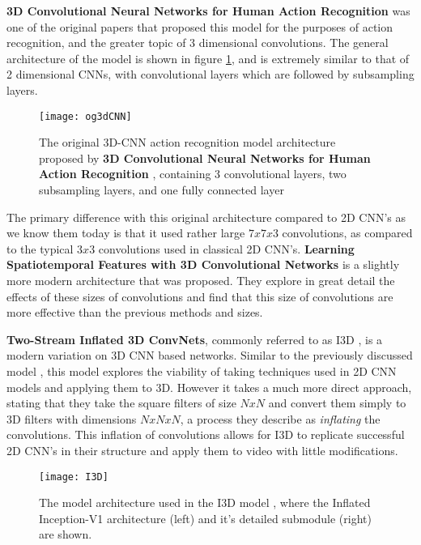 \textbf{3D Convolutional Neural Networks for Human Action Recognition} \cite{3DCNN-ActionRecognition} was one of the original papers that proposed this model for the purposes of action recognition, and the greater topic of 3 dimensional convolutions. The general architecture of the model is shown in figure \ref{fig:original3dcnn}, and is extremely similar to that of 2 dimensional CNNs, with convolutional layers which are followed by subsampling layers.

\begin{figure}[ht]
	\texttt{[image: og3dCNN]}
	\centering
	\caption{The original 3D-CNN action recognition model architecture proposed by \textbf{3D Convolutional Neural Networks for Human Action Recognition} \cite{3DCNN-ActionRecognition}, containing 3 convolutional layers, two subsampling layers, and one fully connected layer}
	\label{fig:original3dcnn}
\end{figure}

The primary difference with this original architecture compared to 2D CNN's as we know them today is that it used rather large $7x7x3$ convolutions, as compared to the typical $3x3$ convolutions used in classical 2D CNN's. \textbf{Learning Spatiotemporal Features with 3D Convolutional Networks} \cite{3x33dcnn} is a slightly more modern architecture that was proposed. They explore in great detail the effects of these sizes of convolutions and find that this size of convolutions are more effective than the previous methods and sizes.

\textbf{Two-Stream Inflated 3D ConvNets}, commonly referred to as I3D \cite{i3d}, is a modern variation on 3D CNN based networks. Similar to the previously discussed model \cite{3DCNN-ActionRecognition}, this model explores the viability of taking techniques used in 2D CNN models and applying them to 3D. However it takes a much more direct approach, stating that they take the square filters of size $NxN$ and convert them simply to 3D filters with dimensions $NxNxN$, a process they describe as \textit{inflating} the convolutions. This inflation of convolutions allows for I3D to replicate successful 2D CNN's in their structure and apply them to video with little modifications.

\begin{figure}[ht]
	\texttt{[image: I3D]}
	\centering
	\caption{The model architecture used in the I3D model \cite{i3d}, where the Inflated Inception-V1 architecture (left) and it's detailed submodule (right) are shown.}
	\label{fig:I3D}
\end{figure}

